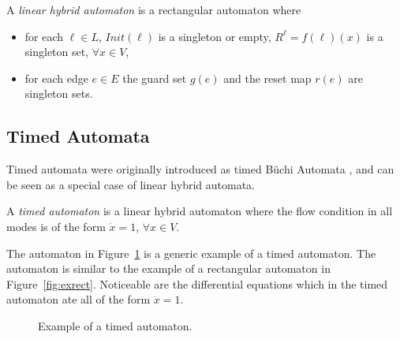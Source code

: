 \begin{defi}
A \emph{linear hybrid automaton} is a rectangular automaton where
\begin{itemize}
    \item{for each $\ell\in L$, $Init(\ell)$ is a singleton or empty, $R^{\ell}=f(\ell)(x)$ is a singleton set, $\forall x\in V$,}
    \item{for each edge $e\in E$ the guard set $g(e)$ and the reset map $r(e)$ are singleton sets.}
\end{itemize}
\end{defi}

\subsection{Timed Automata}
Timed automata were originally introduced as timed B\"{u}chi Automata \cite{Alur1990,Alur1994}, and can be seen as a special case of linear hybrid automata.

\begin{defi}
A \emph{timed automaton} is a linear hybrid automaton where the flow condition in all modes is of the form $\dot{x}=1$, $\forall x\in V$.
\end{defi}

\begin{ex}
The automaton in Figure~\ref{fig:extime} is a generic example of a timed automaton. The automaton is similar to the example of a rectangular automaton in Figure~\ref{fig:exrect}. Noticeable are the differential equations which in the timed automaton ate all of the form $\dot{x}=1$.

\begin{figure}[H]
    \begin{center}
        \caption{Example of a timed automaton.}
        \label{fig:extime}
    \end{center}
\end{figure}
\end{ex}



